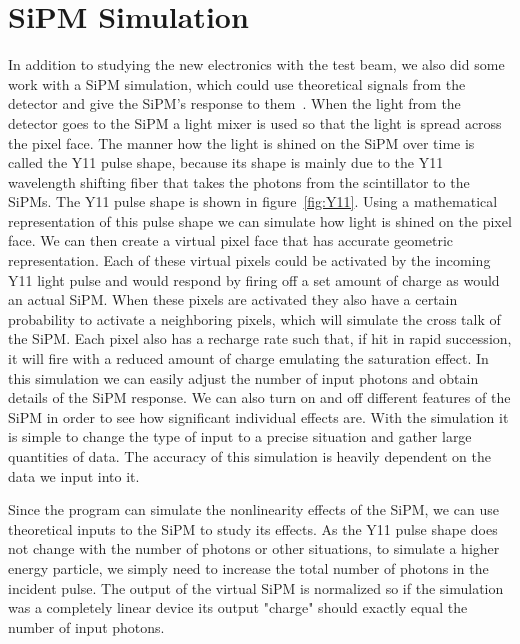 \section{SiPM Simulation}

In addition to studying the new electronics with the test beam, we also did some work with a SiPM simulation, which could use theoretical signals from the detector and give the SiPM's response to them~\cite{SiPMSimulation_github}. When the light from the detector goes to the SiPM a light mixer is used so that the light is spread across the pixel face. The manner how the light is shined on the SiPM over time is called the Y11 pulse shape, because its shape is mainly due to the Y11 wavelength shifting fiber that takes the photons from the scintillator to the SiPMs. The Y11 pulse shape is shown in figure~\ref{fig:Y11}. Using a mathematical representation of this pulse shape we can simulate how light is shined on the pixel face. We can then create a virtual pixel face that has accurate geometric representation. Each of these virtual pixels could be activated by the incoming Y11 light pulse and would respond by firing off a set amount of charge as would an actual SiPM. When these pixels are activated they also have a certain probability to activate a neighboring pixels, which will simulate the cross talk of the SiPM. Each pixel also has a recharge rate such that, if hit in rapid succession, it will fire with a reduced amount of charge emulating the saturation effect. In this simulation we can easily adjust the number of input photons and obtain details of the SiPM response. We can also turn on and off different features of the SiPM in order to see how significant individual effects are. With the simulation it is simple to change the type of input to a precise situation and gather large quantities of data. The accuracy of this simulation is heavily dependent on the data we input into it.

Since the program can simulate the nonlinearity effects of the SiPM, we can use theoretical inputs to the SiPM to study its effects. As the Y11 pulse shape does not change with the number of photons or other situations, to simulate a higher energy particle, we simply need to increase the total number of photons in the incident pulse. The output of the virtual SiPM is normalized so if the simulation was a completely linear device its output "charge" should exactly equal the number of input photons. 

